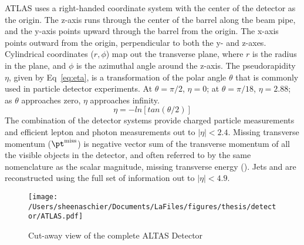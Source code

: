 ATLAS uses a right-handed coordinate system with the center of the detector as the origin.  The z-axis runs through the center of the barrel along the beam pipe, and the y-axis points upward through the barrel from the origin.  The x-axis points outward from the origin, perpendicular to both the y- and z-axes.  Cylindrical coordinates ($r,\phi$) map out the transverse plane, where $r$ is the radius in the plane, and $\phi$ is the azimuthal angle around the z-axis.  The pseudorapidity $\eta$, given by Eq~\ref{eq:eta}, is a transformation of the polar angle $\theta$ that is commonly used in particle detector experiments.  At $\theta=\pi/2$, $\eta=0$; at $\theta=\pi/18$, $\eta=2.88$; as $\theta$ approaches zero, $\eta$ approaches infinity.
\begin{equation}
\eta=-ln[tan(\theta/2)]
\label{eq:eta}
\end{equation}
The combination of the detector systems provide charged particle measurements and efficient lepton and photon measurements out to $|\eta| < 2.4$.  Missing transverse momentum ($\pt^{\mathrm{miss}}$) is negative vector sum of the transverse momentum of all the visible objects in the detector, and often referred to by the same nomenclature as the scalar magnitude, missing transverse energy (\met{}). Jets and \met{} are reconstructed using the full set of information out to $|\eta| < 4.9$.    \begin{figure}[tbp]
  \centering
 \texttt{[image: /Users/sheenaschier/Documents/LaFiles/figures/thesis/detector/ATLAS.pdf]}
    \caption{Cut-away view of the complete ALTAS Detector}
   \label{fig:ATLAS}
 \end{figure}

